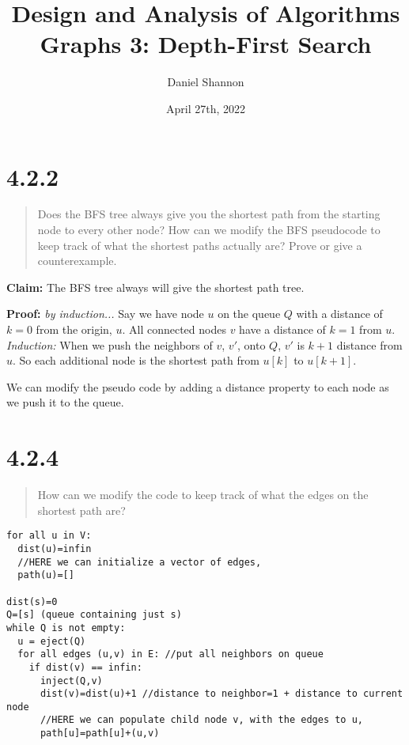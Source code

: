 \documentclass[12pt, letterpaper, twoside]{article}
\title{%
Design and Analysis of Algorithms\\
\large Graphs 3: Depth-First Search
}
\author{Daniel Shannon}
\date{April 27th, 2022}
\begin{document}
\begin{titlepage}
\maketitle
\end{titlepage}
\section*{4.2.2}

\begin{quote}
Does the BFS tree always give you the shortest path from the starting node to every other node?
How can we modify the BFS pseudocode to keep track of what the shortest paths actually are? Prove or give a counterexample.
\end{quote}

\textbf{Claim:} The BFS tree always will give the shortest path tree.

\textbf{Proof:} \emph{by induction...} Say we have node $u$ on the queue $Q$ with a distance of $k=0$ from the origin, $u$. 
All connected nodes $v$ have a distance of $k=1$ from $u$. 
\emph{Induction:} When we push the neighbors of $v$, $v'$, onto $Q$, $v'$ is $k+1$ distance from $u$. 
So each additional node is the shortest path from $u[k]$ to $u[k+1]$.

We can modify the pseudo code by adding a distance property to each node as we push it to the queue.

\section*{4.2.4}

\begin{quote}
How can we modify the code to keep track of what the edges on the shortest path are?
\end{quote}


\begin{lstlisting}
for all u in V:
  dist(u)=infin
  //HERE we can initialize a vector of edges,
  path(u)=[]

dist(s)=0
Q=[s] (queue containing just s)
while Q is not empty:
  u = eject(Q)
  for all edges (u,v) in E: //put all neighbors on queue
    if dist(v) == infin:
      inject(Q,v)
      dist(v)=dist(u)+1 //distance to neighbor=1 + distance to current node
      //HERE we can populate child node v, with the edges to u,
      path[u]=path[u]+(u,v)
\end{lstlisting}
\end{document}
